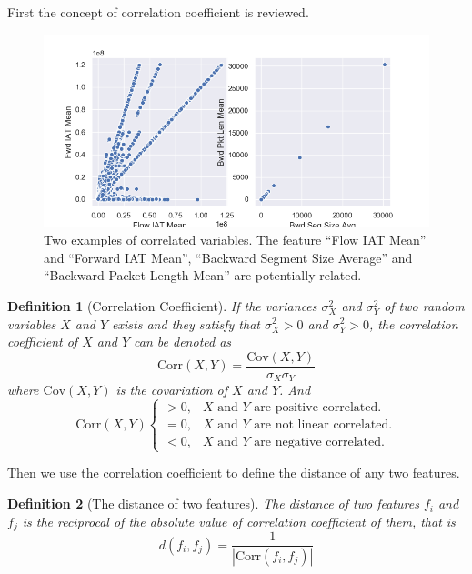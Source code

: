 \documentclass[journal]{IEEEtran}
\newtheorem{definition}{Definition}
\begin{document}
First the concept of correlation coefficient is reviewed.

\begin{figure}
    \centering
    \includegraphics[scale=0.42]{fig/scatter_correlated_variables.png}
    \caption{Two examples of correlated variables. The feature ``Flow IAT Mean'' and ``Forward IAT Mean'', ``Backward Segment Size Average'' and ``Backward Packet Length Mean'' are potentially related. }
    \label{fig:correlated-variables}
\end{figure}

\begin{definition}[Correlation Coefficient]
    If the variances $\sigma^2_X$ and $\sigma_Y^2$ of two random variables $X$ and $Y$ exists and they satisfy that $\sigma^2_X > 0$ and $\sigma^2_Y > 0$, the correlation coefficient of $X$ and $Y$ can be denoted as
\begin{equation}
    \text{Corr}(X, Y) = \frac{\text{Cov}(X, Y)}{\sigma_X \sigma_Y}
\end{equation}
where $\text{Cov}(X, Y)$ is the covariation of $X$ and $Y$. And
$$\text{Corr}(X, Y) \begin{cases}
    > 0, & X \text{ and } Y \text{ are positive correlated.}\\
    = 0, & X \text{ and } Y \text{ are not linear correlated.} \\
    < 0, & X \text{ and } Y \text{ are negative correlated.}
\end{cases}$$
\end{definition}

Then we use the correlation coefficient to define the distance of any two features.

\begin{definition}[The distance of two features]
\label{def:distance}
The distance of two features $f_i$ and $f_j$ is the reciprocal of the absolute value of correlation coefficient of them, that is
\begin{equation}
    \label{eq:distance}
    d(f_i, f_j) = \frac{1}{|\text{Corr}(f_i, f_j)|}
\end{equation}
\end{definition}
\end{document}
